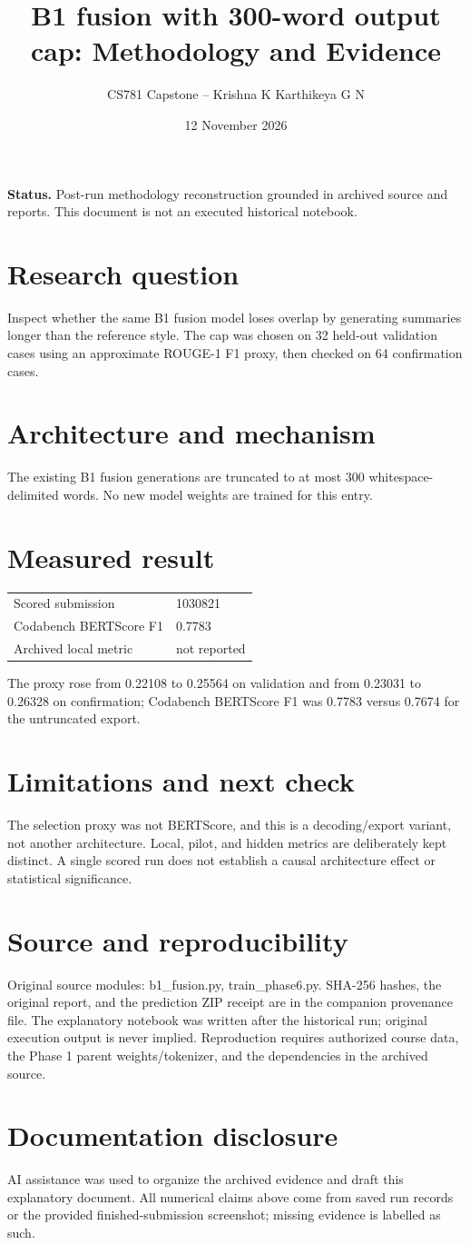 \documentclass[11pt,a4paper]{article}
\title{B1 fusion with 300-word output cap: Methodology and Evidence}
\author{CS781 Capstone -- Krishna K Karthikeya G N}
\date{12 November 2026}
\begin{document}
\maketitle
\noindent\textbf{Status.} Post-run methodology reconstruction grounded in archived source and reports. This document is not an executed historical notebook.\par
\section*{Research question}
Inspect whether the same B1 fusion model loses overlap by generating summaries longer than the reference style. The cap was chosen on 32 held-out validation cases using an approximate ROUGE-1 F1 proxy, then checked on 64 confirmation cases.
\section*{Architecture and mechanism}
The existing B1 fusion generations are truncated to at most 300 whitespace-delimited words. No new model weights are trained for this entry.
\section*{Measured result}
\begin{center}\begin{tabular}{ll}Scored submission & 1030821\\
Codabench BERTScore F1 & 0.7783\\
Archived local metric & not reported\end{tabular}\end{center}
The proxy rose from 0.22108 to 0.25564 on validation and from 0.23031 to 0.26328 on confirmation; Codabench BERTScore F1 was 0.7783 versus 0.7674 for the untruncated export.
\section*{Limitations and next check}
The selection proxy was not BERTScore, and this is a decoding/export variant, not another architecture. Local, pilot, and hidden metrics are deliberately kept distinct. A single scored run does not establish a causal architecture effect or statistical significance.
\section*{Source and reproducibility}
Original source modules: b1\_fusion.py, train\_phase6.py. SHA-256 hashes, the original report, and the prediction ZIP receipt are in the companion provenance file. The explanatory notebook was written after the historical run; original execution output is never implied. Reproduction requires authorized course data, the Phase 1 parent weights/tokenizer, and the dependencies in the archived source.
\section*{Documentation disclosure}
AI assistance was used to organize the archived evidence and draft this explanatory document. All numerical claims above come from saved run records or the provided finished-submission screenshot; missing evidence is labelled as such.
\end{document}

